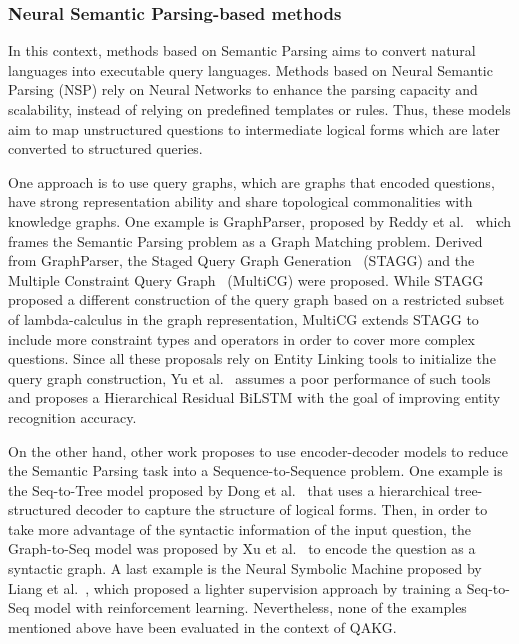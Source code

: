 \subsubsection{Neural Semantic Parsing-based methods}
\label{cap2:qakg/approaches/neuSemParsing}
In this context, methods based on Semantic Parsing aims to convert natural languages into 
executable query languages. Methods based on Neural Semantic Parsing (NSP) rely on Neural 
Networks to enhance the parsing capacity and scalability, instead of relying on predefined 
templates or rules. Thus, these models aim to map unstructured questions to intermediate 
logical forms which are later converted to structured queries.

One approach is to use query graphs, which are graphs that encoded questions, have strong 
representation ability and share topological commonalities with knowledge graphs. One example 
is GraphParser, proposed by Reddy et al.~\cite{qa:ReddyLS14} which frames the Semantic Parsing 
problem as a Graph Matching problem. Derived from GraphParser, the Staged Query Graph 
Generation~\cite{qa:YihCHG15} (STAGG) and the Multiple Constraint Query Graph~\cite{qa:BaoDYZZ16} 
(MultiCG) were proposed. While STAGG proposed a different construction of the query graph based 
on a restricted subset of lambda-calculus in the graph representation, MultiCG extends STAGG to 
include more constraint types and operators in order to cover more complex questions. Since all 
these proposals rely on Entity Linking tools to initialize the query graph construction, 
Yu et al.~\cite{qa:YuYHSXZ17} assumes a poor performance of such tools and proposes a 
Hierarchical Residual BiLSTM with the goal of improving entity recognition accuracy.

On the other hand, other work proposes to use encoder-decoder models to reduce the Semantic 
Parsing task into a Sequence-to-Sequence problem. One example is the Seq-to-Tree model proposed 
by Dong et al.~\cite{nmt:DongL16} that uses a hierarchical tree-structured decoder to capture 
the structure of logical forms. Then, in order to take more advantage of the syntactic 
information of the input question, the Graph-to-Seq model was proposed by Xu et al.~\cite{qa:XuWWYCS18} 
to encode the question as a syntactic graph. A last example is the Neural Symbolic Machine 
proposed by Liang et al.~\cite{qa:LiangBLFL17}, which proposed a lighter supervision approach 
by training a Seq-to-Seq model with reinforcement learning. Nevertheless, none of the examples 
mentioned above have been evaluated in the context of QAKG.

